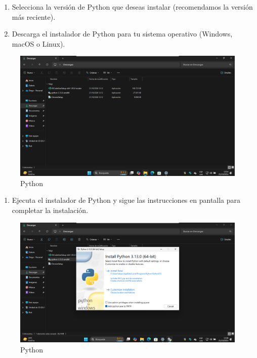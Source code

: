 \documentclass[
  a4paper,
  DIV=11,
  numbers=noendperiod,
  onepage,
  openany]{scrreprt}
\providecommand{\tightlist}{%
  \setlength{\itemsep}{0pt}\setlength{\parskip}{0pt}}\usepackage{longtable,booktabs,array}
\begin{document}
\begin{enumerate}
\def\labelenumi{\arabic{enumi}.}
\setcounter{enumi}{2}
\item
  Selecciona la versión de Python que deseas instalar (recomendamos la
  versión más reciente).
\item
  Descarga el instalador de Python para tu sistema operativo (Windows,
  macOS o Linux).
\end{enumerate}

\begin{figure}[H]

{\centering \includegraphics{unidades/unidad1/images/instalador_python.png}

}

\caption{Python}

\end{figure}%

\begin{enumerate}
\def\labelenumi{\arabic{enumi}.}
\setcounter{enumi}{4}
\tightlist
\item
  Ejecuta el instalador de Python y sigue las instrucciones en pantalla
  para completar la instalación.
\end{enumerate}

\begin{figure}[H]

{\centering \includegraphics{unidades/unidad1/images/add_to_path.png}

}

\caption{Python}

\end{figure}%
\end{document}
